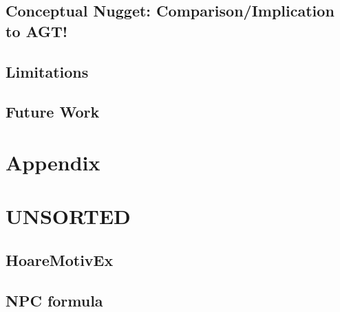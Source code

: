 \section{Conceptual Nugget: Comparison/Implication to AGT!}

\section{Limitations}
\label{sec:limitations}


\section{Future Work}
\label{sec:future-work}


\chapter{Appendix}


\chapter{UNSORTED}

\section{HoareMotivEx}
\label{sec:hoaremotivex}


\section{NPC formula}
\label{sec:npc-formula}
